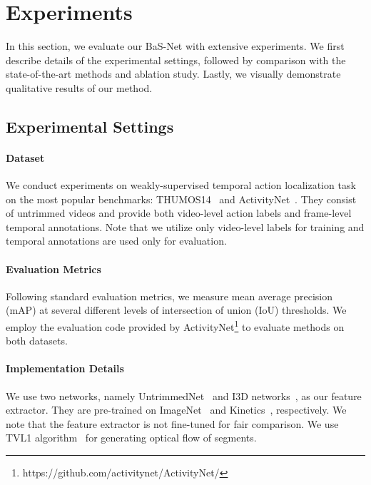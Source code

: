 \documentclass[letterpaper]{article} %
\begin{document}
\begin{table}[t]
\begin{center}
{\begin{tabular}{c|l|ccccccccc}
\end{tabular}
}
\end{center}
\label{table:quant_thumos}
\end{table}

\section{Experiments}
\label{sec:experiments}
In this section, we evaluate our BaS-Net with extensive experiments. We first describe details of the experimental settings, followed by comparison with the state-of-the-art methods and ablation study. Lastly, we visually demonstrate qualitative results of our method.

\subsection{Experimental Settings}
\paragraph{Dataset} We conduct experiments on weakly-supervised temporal action localization task on the most popular benchmarks: THUMOS14~\cite{THUMOS14} and ActivityNet~\cite{caba2015activitynet}. They consist of untrimmed videos and provide both video-level action labels and frame-level temporal annotations. Note that we utilize only video-level labels for training and temporal annotations are used only for evaluation.

\paragraph{Evaluation Metrics} Following standard evaluation metrics, we measure mean average precision (mAP) at several different levels of intersection of union (IoU) thresholds. We employ the evaluation code provided by ActivityNet\footnote{https://github.com/activitynet/ActivityNet/} to evaluate methods on both datasets. 
 
\paragraph{Implementation Details}
We use two networks, namely UntrimmedNet~\cite{wang2017untrimmednets} and I3D networks~\cite{carreira2017quo}, as our feature extractor. They are pre-trained on ImageNet~\cite{deng2009imagenet} and Kinetics~\cite{carreira2017quo}, respectively. We note that the feature extractor is not fine-tuned for fair comparison. We use TVL1 algorithm~\cite{wedel2009improved} for generating optical flow of segments.
\end{document}
